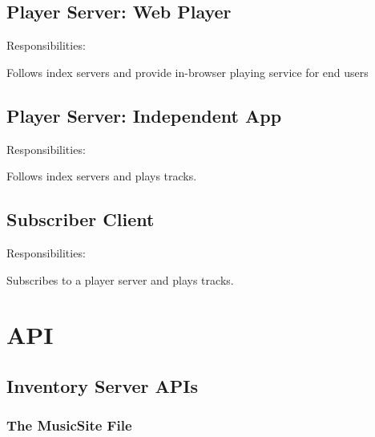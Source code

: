 \documentclass[a4paper,11pt]{article}
\begin{document}
\subsection{Player Server: Web Player}

Responsibilities:

\begin{compactitem}
	\item Follows index servers and provide in-browser playing service for end users
\end{compactitem}

\subsection{Player Server: Independent App}

Responsibilities:

\begin{compactitem}
	\item Follows index servers and plays tracks.
\end{compactitem}

\subsection{Subscriber Client}

Responsibilities:

\begin{compactitem}
	\item Subscribes to a player server and plays tracks.
\end{compactitem}






















\section{API}


\subsection{Inventory Server APIs}

\subsubsection{The MusicSite File}
\end{document}
